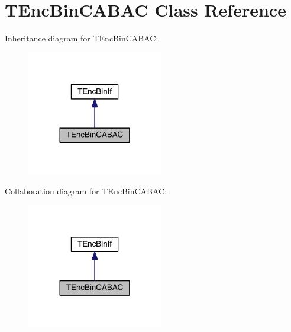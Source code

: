 \hypertarget{class_t_enc_bin_c_a_b_a_c}{}\section{T\+Enc\+Bin\+C\+A\+B\+AC Class Reference}
\label{class_t_enc_bin_c_a_b_a_c}


Inheritance diagram for T\+Enc\+Bin\+C\+A\+B\+AC\+:
\nopagebreak
\begin{figure}[H]
\begin{center}
\leavevmode
\includegraphics[width=168pt]{da/d5c/class_t_enc_bin_c_a_b_a_c__inherit__graph}
\end{center}
\end{figure}


Collaboration diagram for T\+Enc\+Bin\+C\+A\+B\+AC\+:
\nopagebreak
\begin{figure}[H]
\begin{center}
\leavevmode
\includegraphics[width=168pt]{db/d63/class_t_enc_bin_c_a_b_a_c__coll__graph}
\end{center}
\end{figure}
